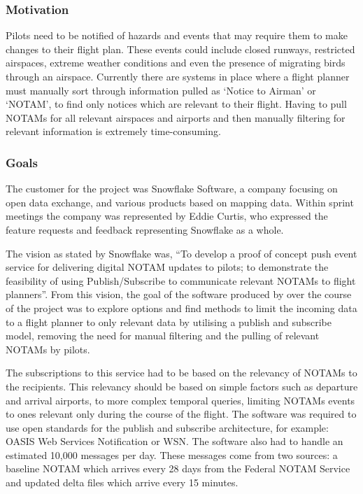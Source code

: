 \documentclass[a4paper, 12pt]{article}
\begin{document}
\subsubsection{Motivation}
Pilots need to be notified of hazards and events that may require them to make changes to their flight plan. These events could include closed runways, restricted airspaces, extreme weather conditions and even the presence of migrating birds through an airspace. Currently there are systems in place where a flight planner must manually sort through information pulled as `Notice to Airman' or `NOTAM', to find only notices which are relevant to their flight. Having to pull NOTAMs for all relevant airspaces and airports and then manually filtering for relevant information is extremely time-consuming. 

\subsubsection{Goals}

The customer for the project was Snowflake Software, a company focusing on open data exchange, and various products based on mapping data. Within sprint meetings the company was represented by Eddie Curtis, who expressed the feature requests and feedback representing Snowflake as a whole.

The vision as stated by Snowflake was, ``To develop a proof of concept push event service for delivering digital NOTAM updates to pilots; to demonstrate the feasibility of using Publish/Subscribe to communicate relevant NOTAMs to flight planners''. From this vision, the goal of the software produced by over the course of the project was to explore options and find methods to limit the incoming data to a flight planner to only relevant data by utilising a publish and subscribe model, removing the need for manual filtering and the pulling of relevant NOTAMs by pilots. 

The subscriptions to this service had to be based on the relevancy of NOTAMs to the recipients. This relevancy should be based on simple factors such as departure and arrival airports, to more complex temporal queries, limiting NOTAMs events to ones relevant only during the course of the flight. The software was required to use open standards for the publish and subscribe architecture, for example: OASIS Web Services Notification or WSN. The software also had to handle an estimated 10,000 messages per day. These messages come from two sources: a baseline NOTAM which arrives every 28 days from the Federal NOTAM Service and updated delta files which arrive every 15 minutes. 
\end{document}

